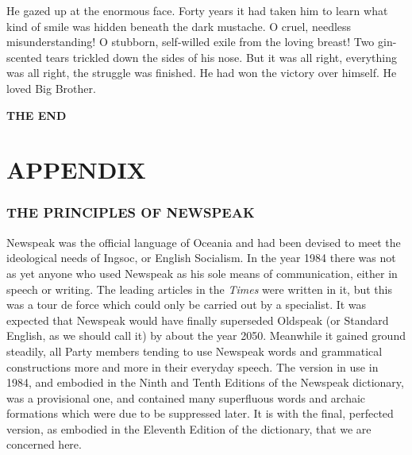 He gazed up at the enormous face. Forty years it had taken him to learn
what kind of smile was hidden beneath the dark mustache. O cruel,
needless misunderstanding! O stubborn, self-willed exile from the loving
breast! Two gin-scented tears trickled down the sides of his nose. But
it was all right, everything was all right, the struggle was finished.
He had won the victory over himself. He loved Big Brother.

\begin{center}
\textbf{THE END}
\end{center}


\clearpage
\part{APPENDIX}\label{appendix}

\section{THE PRINCIPLES OF NEWSPEAK}\label{the-principles-of-newspeak}

Newspeak was the official language of Oceania and had been devised to
meet the ideological needs of Ingsoc, or English Socialism. In the year
1984 there was not as yet anyone who used Newspeak as his sole means of
communication, either in speech or writing. The leading articles in the
\emph{Times} were written in it, but this was a tour de force which
could only be carried out by a specialist. It was expected that Newspeak
would have finally superseded Oldspeak (or Standard English, as we
should call it) by about the year 2050. Meanwhile it gained ground
steadily, all Party members tending to use Newspeak words and
grammatical constructions more and more in their everyday speech. The
version in use in 1984, and embodied in the Ninth and Tenth Editions of
the Newspeak dictionary, was a provisional one, and contained many
superfluous words and archaic formations which were due to be suppressed
later. It is with the final, perfected version, as embodied in the
Eleventh Edition of the dictionary, that we are concerned here.

